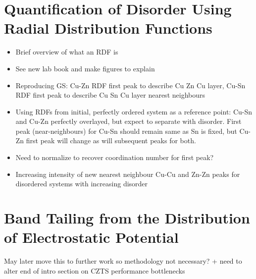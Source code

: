 \section{Quantification of Disorder Using Radial Distribution Functions}\label{RDF_methods}
\begin{itemize}
\item Brief overview of what an RDF is
\item See new lab book and make figures to explain
\item Reproducing GS: Cu-Zn RDF first peak to describe Cu Zn Cu layer, Cu-Sn RDF first peak to describe Cu Sn Cu layer nearest neighbours
\item Using RDFs from initial, perfectly ordered system as a reference point: Cu-Sn and Cu-Zn perfectly overlayed, but expect to separate with disorder. First peak (near-neighbours) for Cu-Sn should remain same as Sn is fixed, but Cu-Zn first peak will change as will subsequent peaks for both.
\item Need to normalize to recover coordination number for first peak?
\item Increasing intensity of new nearest neighbour Cu-Cu and Zn-Zn peaks for disordered systems with increasing disorder
\end{itemize}


\section{Band Tailing from the Distribution of Electrostatic Potential}
May later move this to further work so methodology not necessary? + need to alter end of intro section on CZTS performance bottlenecks



